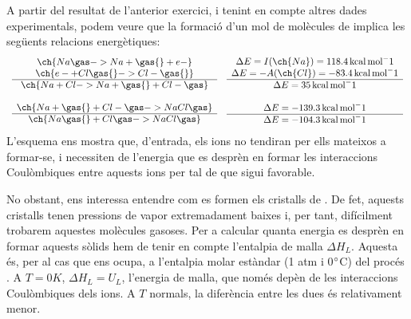A partir del resultat de l'anterior exercici, i tenint en compte altres dades experimentals, podem veure que la formació d'un mol de molècules de  implica les següents relacions energètiques: 
\[
\begin{array}{cc}
\begin{array}{c}
\ch{Na \gas-> Na+ \gas{} + e-}\\
\ch{e- + Cl \gas{} -> Cl- \gas{}}\\
\hline
\ch{Na + Cl -> Na+ \gas{} + Cl- \gas}\\
\\
\ch{Na+ \gas{} + Cl- \gas -> NaCl\gas}\\
\hline
\ch{Na \gas{} + Cl \gas -> NaCl\gas}
\end{array}
\quad
\begin{array}{c}
\Delta E=I(\ch{Na}) = 118.4 \km \\
\Delta E=-A(\ch{Cl}) = -83.4 \km\\
\hline
\Delta E= 35\km \\
\\
\Delta E = -139.3 \km\\
\hline
\Delta E = -104.3 \km
\end{array}
\end{array}
\]
L'esquema ens mostra que, d'entrada, els ions no tendiran per ells mateixos a formar-se, i necessiten de l'energia que es desprèn en formar les interaccions Coulòmbiques entre aquests ions per tal de que sigui favorable.

No obstant, ens interessa entendre com es formen els cristalls de . De fet, aquests cristalls tenen pressions de vapor extremadament baixes i, per tant, difícilment trobarem aquestes molècules gasoses. Per a calcular quanta energia es desprèn en formar aquests sòlids  hem de tenir en compte l'entalpia de malla $\Delta H_L$. Aquesta és, per al cas que ens ocupa,  a l'entalpia molar estàndar (1 atm i 0$\degree$C) del procés  .
A $T=0K$, $\Delta H_L=U_L$, l'energia de malla, que només depèn de les interaccions Coulòmbiques dels ions. A $T$ normals, la diferència entre les dues és relativament menor.

